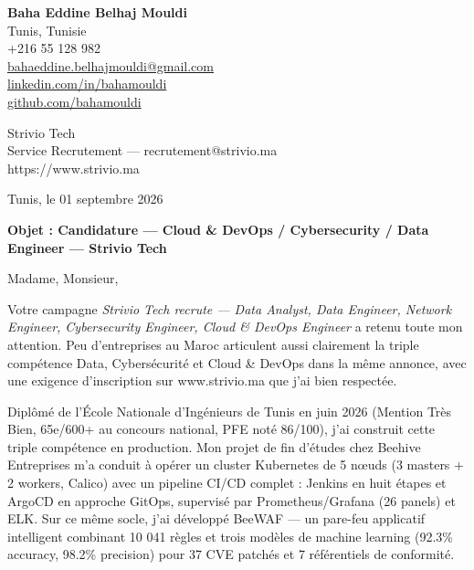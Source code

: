 \documentclass[a4paper,11pt]{article}
\begin{document}
\begin{flushright}
{\bfseries Baha Eddine Belhaj Mouldi}\\
Tunis, Tunisie\\
+216 55 128 982\\
\href{mailto:bahaeddine.belhajmouldi@gmail.com}{bahaeddine.belhajmouldi@gmail.com}\\
\href{https://linkedin.com/in/bahamouldi}{linkedin.com/in/bahamouldi}\\
\href{https://github.com/bahamouldi}{github.com/bahamouldi}
\end{flushright}

\vspace{0.8cm}

\begin{flushleft}
Strivio Tech\\
Service Recrutement — recrutement@strivio.ma\\
https://www.strivio.ma

\vspace{0.8cm}

Tunis, le 01 septembre 2026

\vspace{0.6cm}

{\bfseries Objet : Candidature — Cloud \& DevOps / Cybersecurity / Data Engineer — Strivio Tech}
\end{flushleft}

\vspace{0.6cm}

Madame, Monsieur,

Votre campagne \textit{Strivio Tech recrute — Data Analyst, Data Engineer, Network Engineer, Cybersecurity Engineer, Cloud \& DevOps Engineer} a retenu toute mon attention. Peu d'entreprises au Maroc articulent aussi clairement la triple compétence Data, Cybersécurité et Cloud \& DevOps dans la même annonce, avec une exigence d'inscription sur www.strivio.ma que j'ai bien respectée.

Diplômé de l'École Nationale d'Ingénieurs de Tunis en juin 2026 (Mention Très Bien, 65e/600+ au concours national, PFE noté 86/100), j'ai construit cette triple compétence en production. Mon projet de fin d'études chez Beehive Entreprises m'a conduit à opérer un cluster Kubernetes de 5 nœuds (3 masters + 2 workers, Calico) avec un pipeline CI/CD complet : Jenkins en huit étapes et ArgoCD en approche GitOps, supervisé par Prometheus/Grafana (26 panels) et ELK. Sur ce même socle, j'ai développé BeeWAF — un pare-feu applicatif intelligent combinant 10 041 règles et trois modèles de machine learning (92.3\% accuracy, 98.2\% precision) pour 37 CVE patchés et 7 référentiels de conformité.
\end{document}
